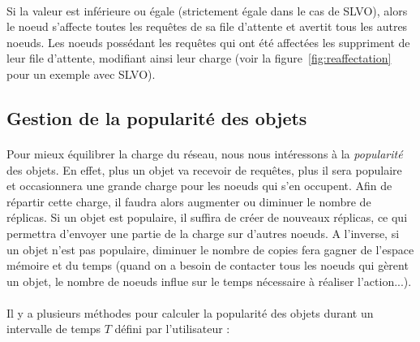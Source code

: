 \documentclass[12pt]{article}
\begin{document}
\paragraph{} Si la valeur est inférieure ou égale (strictement égale dans le cas de SLVO), alors le noeud s'affecte toutes les requêtes de sa file d'attente et avertit tous les autres noeuds. Les noeuds possédant les requêtes qui ont été affectées les suppriment de leur file d'attente, modifiant ainsi leur charge (voir la figure~\ref{fig:reaffectation} pour un exemple avec SLVO).

\subsection{Gestion de la popularité des objets}

\paragraph{} Pour mieux équilibrer la charge du réseau, nous nous intéressons à la \textit{popularité} des objets. En effet, plus un objet va recevoir de requêtes, plus il sera populaire et occasionnera une grande charge pour les noeuds qui s'en occupent. Afin de répartir cette charge, il faudra alors augmenter ou diminuer le nombre de réplicas. Si un objet est populaire, il suffira de créer de nouveaux réplicas, ce qui permettra d'envoyer une partie de la charge sur d'autres noeuds. A l'inverse, si un objet n'est pas populaire, diminuer le nombre de copies fera gagner de l'espace mémoire et du temps (quand on a besoin de contacter tous les noeuds qui gèrent un objet, le nombre de noeuds influe sur le temps nécessaire à réaliser l'action...).

\paragraph{} Il y a plusieurs méthodes pour calculer la popularité des objets durant un intervalle de temps $T$ défini par l'utilisateur :
\end{document}
